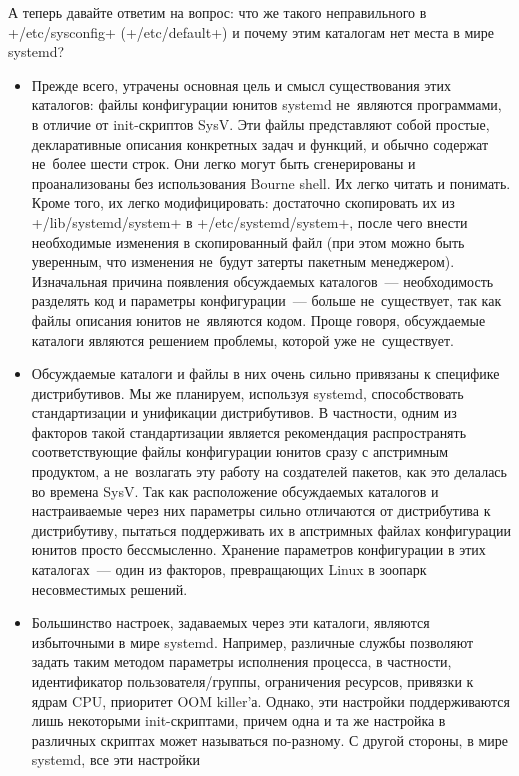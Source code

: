 \documentclass[10pt,oneside,a4paper]{article}
\begin{document}
А теперь давайте ответим на вопрос: что же такого неправильного в
+/etc/sysconfig+ (+/etc/default+) и почему этим каталогам нет места в мире
systemd?
\begin{itemize}
	\item Прежде всего, утрачены основная цель и смысл существования этих
		каталогов: файлы конфигурации юнитов systemd не~являются
		программами, в отличие от init-скриптов SysV. Эти файлы
		представляют собой простые, декларативные описания конкретных
		задач и функций, и обычно содержат не~более шести строк. Они
		легко могут быть сгенерированы и проанализованы без
		использования Bourne shell. Их легко читать и понимать. Кроме
		того, их легко модифицировать: достаточно скопировать их из
		+/lib/systemd/system+ в +/etc/systemd/system+, после чего внести
		необходимые изменения в скопированный файл (при этом можно быть
		уверенным, что изменения не~будут затерты пакетным менеджером).
		Изначальная причина появления обсуждаемых каталогов~---
		необходимость разделять код и параметры конфигурации~--- больше
		не~существует, так как файлы описания юнитов не~являются кодом.
		Проще говоря, обсуждаемые каталоги являются решением проблемы,
		которой уже не~существует.
	\item Обсуждаемые каталоги и файлы в них очень сильно привязаны к
		специфике дистрибутивов. Мы же планируем, используя systemd,
		способствовать стандартизации и унификации дистрибутивов. В
		частности, одним из факторов такой стандартизации является
		рекомендация распространять соответствующие файлы конфигурации
		юнитов сразу с апстримным продуктом, а не~возлагать эту работу
		на создателей пакетов, как это делалась во времена SysV.
		Так как расположение обсуждаемых каталогов и настраиваемые через
		них параметры сильно отличаются от дистрибутива к дистрибутиву,
		пытаться поддерживать их в апстримных файлах конфигурации юнитов
		просто бессмысленно. Хранение параметров конфигурации в этих  
		каталогах~--- один из факторов, превращающих Linux в зоопарк
		несовместимых решений.
	\item Большинство настроек, задаваемых через эти каталоги, являются
		избыточными в мире systemd. Например, различные службы позволяют
		задать таким методом параметры исполнения процесса, в частности,
		идентификатор пользователя/группы, ограничения ресурсов,
		привязки к ядрам CPU, приоритет OOM killer'а. Однако, эти
		настройки поддерживаются лишь некоторыми init-скриптами, причем
		одна и та же настройка в различных скриптах может называться
		по-разному. С другой стороны, в мире systemd, все эти настройки

\end{itemize}
\end{document}

